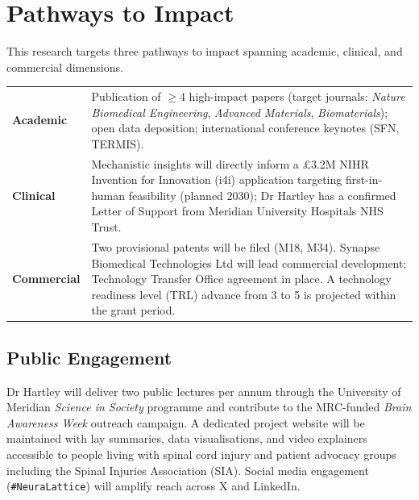 \section{Pathways to Impact}

\begin{tcolorbox}[sectionbox, title=Impact Summary]
This research targets three pathways to impact spanning academic, clinical, and
commercial dimensions.

\vspace{6pt}
\begin{tabular}{@{}p{32mm}p{120mm}@{}}
\textcolor{ukripink}{\textbf{Academic}} &
Publication of \(\geq\)4 high-impact papers (target journals: \textit{Nature
Biomedical Engineering}, \textit{Advanced Materials}, \textit{Biomaterials}); open
data deposition; international conference keynotes (SFN, TERMIS). \\[6pt]
\textcolor{ukripink}{\textbf{Clinical}} &
Mechanistic insights will directly inform a \pounds 3.2M NIHR Invention for Innovation
(i4i) application targeting first-in-human feasibility (planned 2030); Dr Hartley has
a confirmed Letter of Support from Meridian University Hospitals NHS Trust. \\[6pt]
\textcolor{ukripink}{\textbf{Commercial}} &
Two provisional patents will be filed (M18, M34). Synapse Biomedical Technologies Ltd
will lead commercial development; Technology Transfer Office agreement in place. A
technology readiness level (TRL) advance from 3 to 5 is projected within the grant
period. \\
\end{tabular}
\end{tcolorbox}

\subsection{Public Engagement}

Dr Hartley will deliver two public lectures per annum through the University of Meridian
\emph{Science in Society} programme and contribute to the MRC-funded \emph{Brain
Awareness Week} outreach campaign. A dedicated project website will be maintained with
lay summaries, data visualisations, and video explainers accessible to people living
with spinal cord injury and patient advocacy groups including the Spinal Injuries
Association (SIA). Social media engagement (\texttt{\#NeuraLattice}) will amplify reach
across X and LinkedIn.

